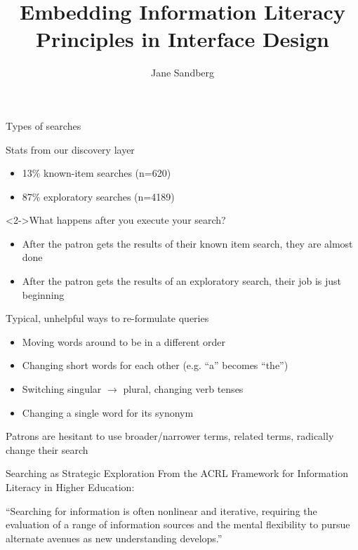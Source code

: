 \documentclass{beamer}
\begin{document}
\title{Embedding Information Literacy Principles in Interface Design}
\author{Jane Sandberg}


\begin{frame}
 \titlepage
\end{frame}

\begin{frame}{Types of searches}
 \begin{block}{Stats from our discovery layer} 
 \begin{itemize}
  \item 13\% known-item searches (n=620)
  \item 87\% exploratory searches (n=4189)
 \end{itemize}
 \end{block}

  \begin{block}<2->{What happens after you execute your search?} 
 \begin{itemize}
  \item After the patron gets the results of their known item search, they are almost done
  \item After the patron gets the results of an exploratory search, their job is just beginning
 \end{itemize}
 \end{block}
\end{frame}

\begin{frame}{Typical, unhelpful ways to re-formulate queries}
 \begin{itemize}
  \item Moving words around to be in a different order
  \item Changing short words for each other (e.g. ``a'' becomes ``the'')
  \item Switching singular $\rightarrow$ plural, changing verb tenses
  \item Changing a single word for its synonym
 \end{itemize}

 Patrons are hesitant to use broader/narrower terms, related terms, radically change their search
 
\end{frame}


\begin{frame}{Searching as Strategic Exploration}
From the ACRL Framework for Information Literacy in Higher Education:

\vfill

``Searching for information is often nonlinear and iterative, requiring the evaluation of a range of information sources and the mental flexibility to pursue alternate avenues as new understanding develops.''
 
\end{frame}
\end{document}
